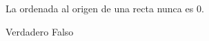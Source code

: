 La ordenada al origen de una recta nunca es 0.

\begin{choices}
    \choice Verdadero
    \CorrectChoice Falso
\end{choices}